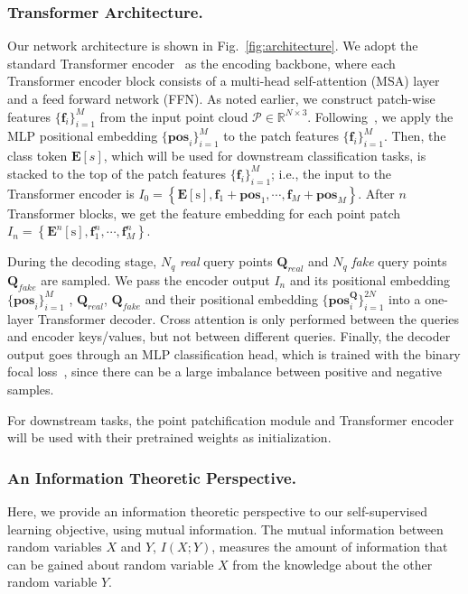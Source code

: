 \documentclass[runningheads]{llncs}
\begin{document}
\vspace{-10pt}
\subsubsection{Transformer Architecture.}
Our network architecture is shown in Fig.~\ref{fig:architecture}. We adopt the standard Transformer encoder~\cite{NIPS2017_3f5ee243} as the encoding  backbone, where each Transformer encoder block consists of a multi-head self-attention (MSA) layer and a feed forward network (FFN). 
As noted earlier, we construct patch-wise features $\{\mathbf{f}_i\}_{i=1}^M$ from the input point cloud $\mathcal{P} \in \mathbb{R}^{N \times 3}$.  Following~\cite{yu2021point}, we apply the MLP positional embedding $\{\mathbf{pos}_i\}_{i=1}^M$  to  the patch features $\{\mathbf{f}_i\}_{i=1}^M$. Then, the class token $\mathbf{E}[s]$, which will be used for downstream classification tasks, is stacked to the top of the patch features $\{\mathbf{f}_i\}_{i=1}^M$;
i.e., the input to the Transformer encoder is $I_0=\left\{\mathbf{E}[\mathrm{s}], \mathbf{f}_{1} +  \mathbf{pos}_1, \cdots, \mathbf{f}_{M} +\mathbf{pos}_M \right\}$. After $n$ Transformer blocks, we get the feature embedding for each point patch $I_n=\left\{\mathbf{E}^n[\mathrm{s}], \mathbf{f}^n_{1} , \cdots, \mathbf{f}^n_{M}  \right\}$. 

During the decoding stage, $N_q$ \textit{real} query points  $\mathbf{Q}_{real}$  and $N_q$ \textit{fake} query points $\mathbf{Q}_{fake}$ are sampled. 
We pass the encoder output $I_n$ and its positional embedding $\{\mathbf{pos}_i\}_{i=1}^M$ , $\mathbf{Q}_{real}$, $\mathbf{Q}_{fake}$ and their positional embedding $\{\mathbf{pos}^{\mathbf{Q}}_i\}_{i=1}^{2N}$ into a one-layer Transformer decoder.
Cross attention is only performed between the queries and encoder keys/values, but not between different queries.
Finally, the decoder output goes through an MLP classification head, which is trained with the binary focal loss~\cite{focalloss}, since there can be a large imbalance between positive and negative samples.

For downstream tasks, the point patchification module and Transformer encoder will be used with their pretrained weights as initialization. 

\vspace{-10pt}
\subsubsection{An Information Theoretic Perspective.}
Here, we provide an information theoretic perspective to our self-supervised learning objective, using mutual information. The mutual information between random variables $X$ and $Y$, $I(X; Y)$, measures the amount of information that can be gained about random variable $X$ from the knowledge about the other random variable $Y$. 
\end{document}
